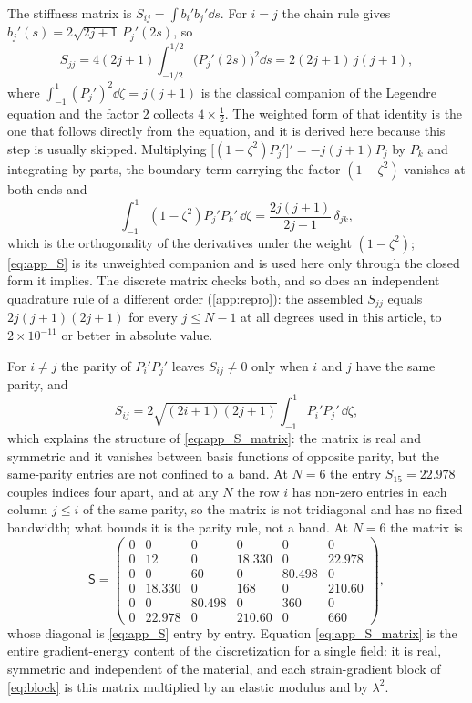 The stiffness matrix is $S_{ij}=\int b_i'b_j'\dd s$.  For $i=j$ the chain rule
gives $b_j'(s)=2\sqrt{2j+1}\,P_j'(2s)$, so
\begin{equation}
\label{eq:app_S}
S_{jj}=4(2j+1)\int_{-1/2}^{1/2}\bigl(P_j'(2s)\bigr)^{2}\dd s
=2(2j+1)\,j(j+1),
\end{equation}
where $\int_{-1}^{1}(P_j')^{2}\dd\zeta=j(j+1)$ is the classical companion of the
Legendre equation and the factor $2$ collects $4\times\tfrac12$.  The weighted
form of that identity is the one that follows directly from the equation, and it is derived here because this step is usually skipped.  Multiplying
$\bigl[(1-\zeta^{2})P_j'\bigr]'=-j(j+1)P_j$ by $P_k$ and integrating by parts, the
boundary term carrying the factor $(1-\zeta^{2})$ vanishes at both ends and
\begin{equation*}
\int_{-1}^{1}(1-\zeta^{2})P_j'P_k'\,\dd\zeta
=\frac{2j(j+1)}{2j+1}\,\delta_{jk},
\end{equation*}
which is the orthogonality of the derivatives under the weight
$(1-\zeta^{2})$; \eqref{eq:app_S} is its unweighted companion and is used here
only through the closed form it implies.  The discrete matrix checks both, and so
does an independent quadrature rule of a different order
(\cref{app:repro}): the assembled $S_{jj}$ equals $2j(j+1)(2j+1)$ for every
$j\le N-1$ at all degrees used in this article, to $2\times10^{-11}$ or better
in absolute value.

For $i\neq j$ the parity of $P_i'P_j'$ leaves $S_{ij}\neq0$ only when $i$ and $j$
have the same parity, and
\begin{equation*}
S_{ij}=2\sqrt{(2i+1)(2j+1)}\int_{-1}^{1}P_i'P_j'\,\dd\zeta ,
\end{equation*}
which explains the structure of \eqref{eq:app_S_matrix}: the matrix is
real and symmetric and it vanishes between basis functions of opposite parity,
but the same-parity entries are not confined to a band.  At $N=6$ the entry
$S_{15}=22.978$ couples indices four apart, and at any $N$ the row $i$ has
non-zero entries in each column $j\le i$ of the same parity, so the matrix is
not tridiagonal and has no fixed bandwidth; what bounds it is the parity rule,
not a band.  At $N=6$ the matrix is
\begin{equation}
\label{eq:app_S_matrix}
\mathsf S=
\begin{pmatrix}
0&0&0&0&0&0\\
0&12&0&18.330&0&22.978\\
0&0&60&0&80.498&0\\
0&18.330&0&168&0&210.60\\
0&0&80.498&0&360&0\\
0&22.978&0&210.60&0&660
\end{pmatrix},
\end{equation}
whose diagonal is \eqref{eq:app_S} entry by entry.  Equation
\eqref{eq:app_S_matrix} is the entire gradient-energy content of the
discretization for a single field: it is real, symmetric and independent of the
material, and each strain-gradient block of \eqref{eq:block} is this matrix
multiplied by an elastic modulus and by $\lambda^{2}$.

